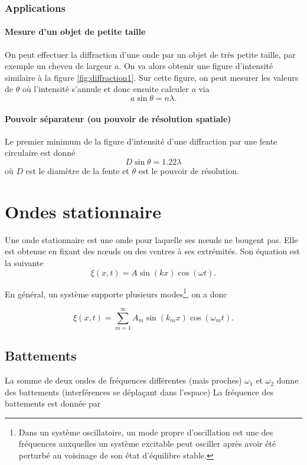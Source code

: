 \subsubsection{Applications}
\paragraph{Mesure d'un objet de petite taille}
On peut effectuer la diffraction d'une onde par un objet de très petite
taille, par exemple un cheveu de largeur $a$. On va alors 
obtenir une figure d'intensité similaire à la figure \ref{fig:diffraction1}.
Sur cette figure, on peut mesurer les valeurs de $\theta$
où l'intensité s'annule et donc ensuite calculer $a$ via
\[ a\sin\theta = n\lambda.\]

\paragraph{Pouvoir séparateur (ou pouvoir de résolution spatiale)}
Le premier minimum de la figure d'intensité d'une
diffraction par une fente circulaire est donné
\[ D\sin\theta = 1.22\lambda\]
où $D$ est le diamètre de la fente et $\theta$ est
le pouvoir de résolution.

\section{Ondes stationnaire}
Une onde stationnaire est une onde pour laquelle ses nœuds ne bougent pas.
Elle est obtenue en fixant des nœuds ou des ventres à ses extrémités.
Son équation est la suivante
\[ \xi(x, t) = A \sin(kx) \cos(\omega t). \]

En général, un système supporte plusieurs modes\footnote{Dans un système
oscillatoire, un mode propre d'oscillation est une des fréquences auxquelles
un système excitable peut osciller après avoir été perturbé au voisinage
de son état d'équilibre stable.}, on a donc

$$\xi(x, t) = \sum_{m=1}^{\infty} A_m \sin(k_mx) \cos(\omega_m t).$$


\subsection{Battements}
La somme de deux ondes de fréquences différentes (mais proches)
$\omega_1$ et $\omega_2$ donne des battements (interférences se
déplaçant dans l'espace) La fréquence des battements
est donnée par

